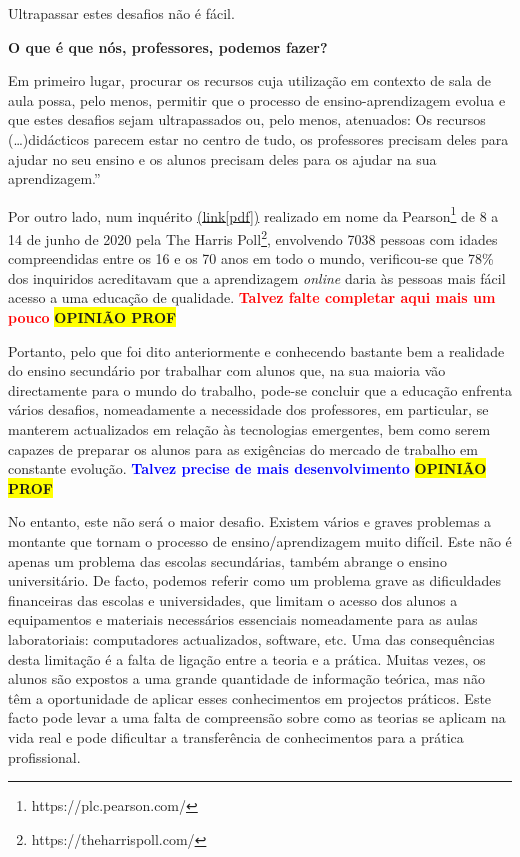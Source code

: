 Ultrapassar estes desafios não é fácil.

\textbf{O que é que nós, professores, podemos fazer?}

Em primeiro lugar, procurar os recursos cuja utilização em contexto de sala de aula possa, pelo menos, permitir que o processo de ensino-aprendizagem evolua e que estes desafios sejam ultrapassados ou, pelo menos, atenuados: Os recursos (\ldots)didácticos parecem estar no centro de tudo, os professores precisam deles para ajudar no seu ensino e os alunos precisam deles para os ajudar na sua aprendizagem\cite{virtuallabng}.''

Por outro lado, num inquérito \href{https://plc.pearson.com/sites/pearson-corp/files/footer-image/pearson-global-learners-survey-2020.pdf}{(link[pdf])} realizado em nome da Pearson\footnote{https://plc.pearson.com/} de 8 a 14 de junho de 2020 pela The Harris Poll\footnote{https://theharrispoll.com/}, envolvendo 7038 pessoas com idades compreendidas entre os 16 e os 70 anos em todo o mundo, verificou-se que 78\% dos inquiridos acreditavam que a aprendizagem \textit{online} daria às pessoas mais fácil acesso a uma educação de qualidade. \textbf{\textcolor{red}{Talvez falte completar aqui mais um pouco}} \colorbox{yellow}{\textbf{OPINIÃO PROF}}

Portanto, pelo que foi dito anteriormente e conhecendo bastante bem a realidade do ensino secundário por trabalhar com alunos que, na sua maioria vão directamente para o mundo do trabalho, pode-se concluir que a educação enfrenta vários desafios, nomeadamente a necessidade dos professores, em particular, se manterem actualizados em relação às tecnologias emergentes, bem como serem capazes de preparar os alunos para as exigências do mercado de trabalho em constante evolução.
\textcolor{blue}{\textbf{Talvez precise de mais desenvolvimento}} \colorbox{yellow}{\textbf{OPINIÃO PROF}}

No entanto, este não será o maior desafio. Existem vários e graves problemas a montante que tornam o processo de ensino/aprendizagem muito difícil. Este não é apenas um problema das escolas secundárias, também abrange o ensino universitário. De facto, podemos referir como um problema grave as dificuldades financeiras\cite{dificuldadesfinanciamento} \cite{Financiamentoprofissional} \cite{Educacaofinanciamento} das escolas e universidades, que limitam o acesso dos alunos a equipamentos e materiais necessários essenciais nomeadamente para as aulas laboratoriais: computadores actualizados, software, etc. Uma das consequências desta limitação é a falta de ligação entre a teoria e a prática. Muitas vezes, os alunos são expostos a uma grande quantidade de informação teórica, mas não têm a oportunidade de aplicar esses conhecimentos em projectos práticos. Este facto pode levar a uma falta de compreensão sobre como as teorias se aplicam na vida real e pode dificultar a transferência de conhecimentos para a prática profissional.


